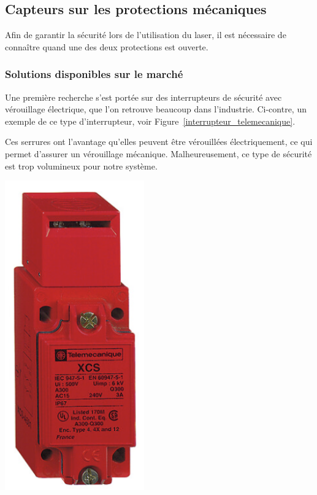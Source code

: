 \subsection{Capteurs sur les protections mécaniques}
Afin de garantir la sécurité lors de l'utilisation du laser, il est nécessaire de connaître quand une des deux protections est ouverte.

\subsubsection{Solutions disponibles sur le marché}
\begin{minipage}[c]{0.6\textwidth}
    Une première recherche s'est portée sur des interrupteurs de sécurité avec vérouillage électrique, que l'on retrouve beaucoup dans l'industrie. Ci-contre, un exemple de ce type d'interrupteur, voir Figure~\ref{interrupteur_telemecanique}.

    Ces serrures ont l'avantage qu'elles peuvent être vérouillées électriquement, ce qui permet d'assurer un vérouillage mécanique. Malheureusement, ce type de sécurité est trop volumineux pour notre système.
\end{minipage}\hfill
\begin{minipage}[c]{0.35\textwidth}
    \begin{center}
        \includegraphics[width=0.45\textwidth]{assets/figures/Protections_laser/serrure_telemecanique.png}
    \end{center}
    \label{interrupteur_telemecanique}
\end{minipage}

